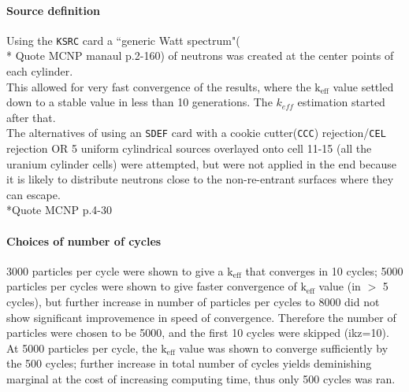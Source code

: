 \documentclass[a4paper, 12pt]{article}
\begin{document}
\paragraph{Source definition}
Using the \texttt{KSRC} card a ``generic Watt spectrum"(\\* Quote MCNP manaul p.2-160) of neutrons was created at the center points of each cylinder.
\\This allowed for very fast convergence of the results, where the $\text{k}_{\text{eff}}$ value settled down to a stable value in less than 10 generations. The $k_{eff}$ estimation started after that.
\\The alternatives of using an \texttt{SDEF} card with a cookie cutter(\texttt{CCC}) rejection/\texttt{CEL} rejection OR 5 uniform cylindrical sources overlayed onto cell 11-15 (all the uranium cylinder cells) were attempted, but were not applied in the end because it is likely to distribute neutrons close to the non-re-entrant surfaces where they can escape. \\*Quote MCNP p.4-30

\paragraph{Choices of number of cycles}
3000 particles per cycle were shown to give a $\text{k}_{\text{eff}}$ that converges in 10 cycles; 5000 particles per cycles were shown to give faster convergence of $\text{k}_{\text{eff}}$ value (in $>$ 5 cycles), but further increase in number of particles per cycles to 8000 did not show significant improvemence in speed of convergence. Therefore the number of particles were chosen to be 5000, and the first 10 cycles were skipped (ikz=10).
At 5000 particles per cycle, the $\text{k}_{\text{eff}}$ value was shown to converge sufficiently by the 500 cycles; further increase in total number of cycles yields deminishing marginal at the cost of increasing computing time, thus only 500 cycles was ran.
\end{document}

